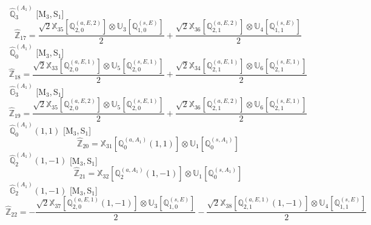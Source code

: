\documentclass[fleqn,10pt,landscape]{article}
\begin{document}
\begin{itemize}
\noindent {} $\,\,\,\hat{\mathbb{Q}}_{3}^{(A_{1})}$ [M$_{3}$,\,S$_{1}$]
\begin{dmath*}
\hat{\mathbb{Z}}_{17}=\frac{\sqrt{2} \mathbb{X}_{35}[\mathbb{Q}_{2,0}^{(a,E,2)}] \otimes\mathbb{U}_{3}[\mathbb{Q}_{1,0}^{(s,E)}]}{2} + \frac{\sqrt{2} \mathbb{X}_{36}[\mathbb{Q}_{2,1}^{(a,E,2)}] \otimes\mathbb{U}_{4}[\mathbb{Q}_{1,1}^{(s,E)}]}{2}
\end{dmath*}
\vspace{4mm}
\noindent {} $\,\,\,\hat{\mathbb{Q}}_{0}^{(A_{1})}$ [M$_{3}$,\,S$_{1}$]
\begin{dmath*}
\hat{\mathbb{Z}}_{18}=\frac{\sqrt{2} \mathbb{X}_{33}[\mathbb{Q}_{2,0}^{(a,E,1)}] \otimes\mathbb{U}_{5}[\mathbb{Q}_{2,0}^{(s,E,1)}]}{2} + \frac{\sqrt{2} \mathbb{X}_{34}[\mathbb{Q}_{2,1}^{(a,E,1)}] \otimes\mathbb{U}_{6}[\mathbb{Q}_{2,1}^{(s,E,1)}]}{2}
\end{dmath*}
\vspace{4mm}
\noindent {} $\,\,\,\hat{\mathbb{G}}_{3}^{(A_{1})}$ [M$_{3}$,\,S$_{1}$]
\begin{dmath*}
\hat{\mathbb{Z}}_{19}=\frac{\sqrt{2} \mathbb{X}_{35}[\mathbb{Q}_{2,0}^{(a,E,2)}] \otimes\mathbb{U}_{5}[\mathbb{Q}_{2,0}^{(s,E,1)}]}{2} + \frac{\sqrt{2} \mathbb{X}_{36}[\mathbb{Q}_{2,1}^{(a,E,2)}] \otimes\mathbb{U}_{6}[\mathbb{Q}_{2,1}^{(s,E,1)}]}{2}
\end{dmath*}
\vspace{4mm}
\noindent {} $\,\,\,\hat{\mathbb{Q}}_{0}^{(A_{1})}(1,1)$ [M$_{3}$,\,S$_{1}$]
\begin{dmath*}
\hat{\mathbb{Z}}_{20}=\mathbb{X}_{31}[\mathbb{Q}_{0}^{(a,A_{1})}(1,1)] \otimes\mathbb{U}_{1}[\mathbb{Q}_{0}^{(s,A_{1})}]
\end{dmath*}
\vspace{4mm}
\noindent {} $\,\,\,\hat{\mathbb{Q}}_{2}^{(A_{1})}(1,-1)$ [M$_{3}$,\,S$_{1}$]
\begin{dmath*}
\hat{\mathbb{Z}}_{21}=\mathbb{X}_{32}[\mathbb{Q}_{2}^{(a,A_{1})}(1,-1)] \otimes\mathbb{U}_{1}[\mathbb{Q}_{0}^{(s,A_{1})}]
\end{dmath*}
\vspace{4mm}
\noindent {} $\,\,\,\hat{\mathbb{G}}_{2}^{(A_{1})}(1,-1)$ [M$_{3}$,\,S$_{1}$]
\begin{dmath*}
\hat{\mathbb{Z}}_{22}=- \frac{\sqrt{2} \mathbb{X}_{37}[\mathbb{Q}_{2,0}^{(a,E,1)}(1,-1)] \otimes\mathbb{U}_{3}[\mathbb{Q}_{1,0}^{(s,E)}]}{2} - \frac{\sqrt{2} \mathbb{X}_{38}[\mathbb{Q}_{2,1}^{(a,E,1)}(1,-1)] \otimes\mathbb{U}_{4}[\mathbb{Q}_{1,1}^{(s,E)}]}{2}

\end{dmath*}
\end{itemize}
\end{document}
